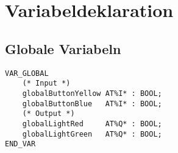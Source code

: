 


\section{Variabeldeklaration}

\subsection{Globale Variabeln}
\begin{lstlisting}
VAR_GLOBAL
    (* Input *)
    globalButtonYellow AT%I* : BOOL;
    globalButtonBlue   AT%I* : BOOL;
    (* Output *)
    globalLightRed     AT%Q* : BOOL;
    globalLightGreen   AT%Q* : BOOL;
END_VAR
\end{lstlisting}

